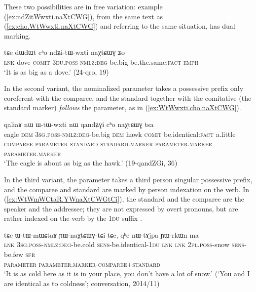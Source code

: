 These two possibilities are in free variation: example (\ref{ex:ndZitWwxti.naXtCWG}), from the same text as (\ref{ex:cho.WtWwxti.naXtCWG}) and referring to the same situation, has dual marking.

\begin{exe}
\ex \label{ex:ndZitWwxti.naXtCWG}
\gll tɕe  dɯdɯt cʰo ndʑi-tɯ-wxti naχtɕɯɣ ʑo \\
\textsc{lnk} dove \textsc{comit} \textsc{3du}.\textsc{poss}-\textsc{nmlz}:\textsc{deg}-be.big be.the.same:\textsc{fact} \textsc{emph} \\
\glt `It is as big as a dove.' (24-qro, 19)
\end{exe}

In the second variant,  the nominalized parameter takes a possessive prefix only coreferent with the comparee, and the standard together with the comitative (the standard marker) \textit{follows} the parameter, as in (\ref{ex:WtWwxti.cho.naXtCWG}).

\begin{exe}
\ex \label{ex:WtWwxti.cho.naXtCWG}
\glll qaliaʁ nɯ ɯ-tɯ-wxti nɯ qandʑɣi cʰo naχtɕɯɣ tsa 	\\
eagle \textsc{dem} \textsc{3sg}.\textsc{poss}-\textsc{nmlz}:\textsc{deg}-be.big \textsc{dem} hawk \textsc{comit} be.identical:\textsc{fact} a.little  \\
{\textsc{comparee}} { } \textsc{parameter} { } {\textsc{standard}} \textsc{standard}.\textsc{marker} \textsc{parameter}.\textsc{marker}  \textsc{parameter}.\textsc{marker} \\
\glt `The eagle is about as big as the hawk.' (19-qandZGi, 36)
\end{exe}

In the third variant, the parameter takes a third person singular possessive prefix, and the comparee and standard are marked by person indexation on the verb. In (\ref{ex:WtWmWCtaR.YWnaXtCWGtCi}), the standard and the comparee are the speaker and the addressee; they are not expressed by overt pronouns, but are rather indexed on the verb by the \textsc{1du} suffix .

\begin{exe}
\ex \label{ex:WtWmWCtaR.YWnaXtCWGtCi}
\glll tɕe ɯ-tɯ-mɯɕtaʁ ɲɯ-naχtɕɯɣ-tɕi tɕe, qʰe nɯ-tɤjpa ɲɯ-rkɯn ma\\
\textsc{lnk} \textsc{3sg}.\textsc{poss}-\textsc{nmlz}:\textsc{deg}-be.cold \textsc{sens}-be.identical-\textsc{1du} \textsc{lnk} \textsc{lnk} \textsc{2pl}.\textsc{poss}-snow \textsc{sens}-be.few \textsc{sfr}\\
{ } \textsc{parameter} \textsc{parameter}.\textsc{marker}-\textsc{comparee+standard}\\
\glt `It is as cold here as it is in your place, you don't have a lot of snow.' (`You and I are identical as to coldness'; conversation, 2014/11)
\end{exe}
%
